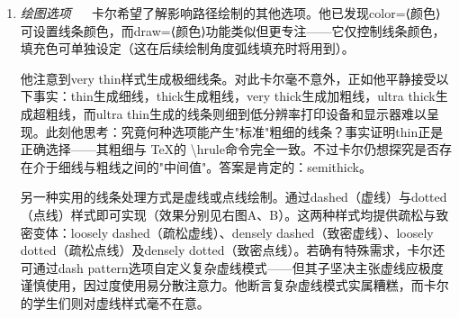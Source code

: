 \begin{enumerate}
    通过参数化机制，样式的功能变得更加强大。这意味着样式可以像其他选项一样接收参数。例如，卡尔可以将其网格样式参数化——默认显示为蓝色，同时保留切换其他颜色的灵活性：
    \begin{verbatim} 
    \begin{tikzpicture}
    [Karl's grid/.style ={help lines,color=#1!50},
    Karl's grid/.default=blue]

    \draw[Karl's grid]     (0,0) grid (1.5,2);
    \draw[Karl's grid=red] (2,0) grid (3.5,2);
    \end{tikzpicture}
    \end{verbatim}

    在此示例中，`Karl's grid`样式被定义为 \{tikzpicture\}环境的可选参数。如需为其他元素添加样式，只需以逗号分隔继续追加。当存在多个样式定义时，环境的可选参数长度很可能超过实际的绘图内容本身。
    \vskip 10mm
    \item \emph{绘图选项} ~~
    卡尔希望了解影响路径绘制的其他选项。他已发现color=⟨颜色⟩可设置线条颜色，而draw=⟨颜色⟩功能类似但更专注——它仅控制线条颜色，填充色可单独设定（这在后续绘制角度弧线填充时将用到）。

    他注意到very thin样式生成极细线条。对此卡尔毫不意外，正如他平静接受以下事实：thin生成细线，thick生成粗线，very thick生成加粗线，ultra thick生成超粗线，而ultra thin生成的线条则细到低分辨率打印设备和显示器难以呈现。此刻他思考：究竟何种选项能产生"标准"粗细的线条？事实证明thin正是正确选择——其粗细与 \TeX 的 \backslash hrule命令完全一致。不过卡尔仍想探究是否存在介于细线与粗线之间的"中间值"。答案是肯定的：semithick。

    另一种实用的线条处理方式是虚线或点线绘制。通过dashed（虚线）与dotted（点线）样式即可实现（效果分别见右图A、B）。这两种样式均提供疏松与致密变体：loosely dashed（疏松虚线）、densely dashed（致密虚线）、loosely dotted（疏松点线）及densely dotted（致密点线）。若确有特殊需求，卡尔还可通过dash pattern选项自定义复杂虚线模式——但其子坚决主张虚线应极度谨慎使用，因过度使用易分散注意力。他断言复杂虚线模式实属糟糕，而卡尔的学生们则对虚线样式毫不在意。


\end{enumerate}
